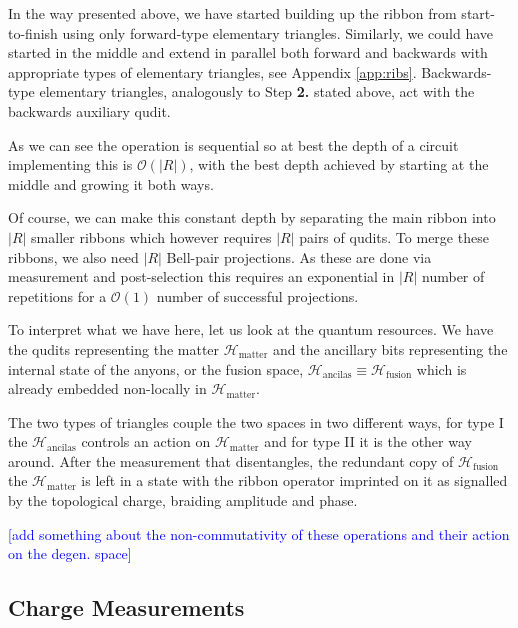 \documentclass[two column]{article}
\newcommand{\caro}[1]{\textcolor{red}{[#1]}}
\newcommand{\jovan}[1]{\textcolor{blue}{[#1]}}
\begin{document}
In the way presented above, we have started building up the ribbon from start-to-finish using only forward-type elementary triangles. Similarly, we could have started in the middle and extend in parallel both forward and backwards with appropriate types of elementary triangles, see Appendix \ref{app:ribs}. Backwards-type elementary triangles, analogously to Step \textbf{2.} stated above, act with the backwards auxiliary qudit.

As we can see the operation is sequential so at best the depth of a circuit implementing this is $\mathcal{O}(|R|)$, with the best depth achieved by starting at the middle and growing it both ways.

Of course, we can make this constant depth by separating the main ribbon into $|R|$ smaller ribbons which however requires $|R|$ pairs of qudits. To merge these ribbons, we also need $|R|$ Bell-pair projections. As these are done via measurement and post-selection this requires an exponential in $|R|$ number of repetitions for a $\mathcal{O}(1)$ number of successful projections.

To interpret what we have here, let us look at the quantum resources. We have the qudits representing the matter $\mathcal{H}_{\text{matter}}$ and the ancillary bits representing the internal state of the anyons, or the fusion space, $\mathcal{H}_{\text{ancilas}} \equiv \mathcal{H}_{\text{fusion}}$ which is already embedded non-locally in  $\mathcal{H}_{\text{matter}}$.

The two types of triangles couple the two spaces in two different ways, for type I the $\mathcal{H}_{\text{ancilas}}$ controls an action on $\mathcal{H}_{\text{matter}}$ and for type II it is the other way around. After the measurement that disentangles, the redundant copy of $\mathcal{H}_{\text{fusion}}$ the $\mathcal{H}_{\text{matter}}$ is left in a state with the ribbon operator imprinted on it as signalled by the topological charge, braiding amplitude and phase.

\jovan{add something about the non-commutativity of these operations and their action on the degen. space}

\subsection{Charge Measurements}
\end{document}
